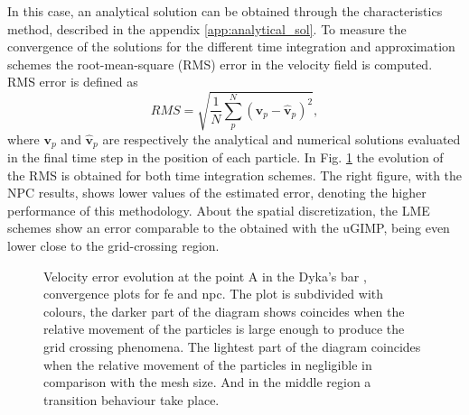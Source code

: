 \documentclass[preprint,12pt,a4paper]{elsarticle}
\newcommand{\vect}[1]{
  \ensuremath{\mathbf{{#1}}}
}
\begin{document}
In this case, an analytical solution can be obtained
through the characteristics method, described in the appendix
\ref{app:analytical_sol}. To measure the convergence of the solutions
for the different time integration and approximation schemes the
root-mean-square (RMS) error in the velocity field is computed. RMS
error is defined as
\begin{equation}
  \label{eq:RMS}
  RMS = \sqrt{\frac{1}{N} \sum^{N}_p \left( \vect{v}_p - \hat{\vect{v}}_p \right)^2},
\end{equation}
where $\vect{v}_p$ and $\hat{\vect{v}}_p$ are respectively the analytical and
numerical solutions evaluated in the final time step in the position
of each particle. In Fig. \ref{fig:Dyka-error-evol} the evolution of the RMS is obtained for both time integration schemes. The right figure, with the \acrshort{NPC} results, shows lower values of the estimated error, denoting the higher performance of this methodology. About the spatial discretization, the \acrshort{LME} schemes show an error comparable to the obtained with the \acrshort{uGIMP}, being even lower close to the grid-crossing region.

\begin{figure}\sidecaption
  \centering
  \caption{Velocity error evolution at the point A in the Dyka's bar ,
    convergence plots for \acrshort{fe} and \acrshort{npc}. The plot is subdivided with
    colours, the darker part of the diagram shows coincides when the
    relative movement of the particles is large enough to produce the
    grid crossing phenomena. The lightest part of the diagram
    coincides when the relative movement of the particles in
    negligible in comparison with the mesh size. And in the middle
    region a transition behaviour take place.}
  \label{fig:Dyka-error-evol}
\end{figure}
\end{document}
